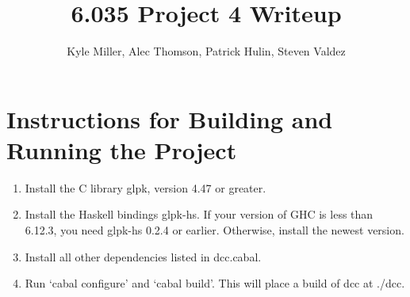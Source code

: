 \documentclass[11pt]{article}
\title{6.035 Project 4 Writeup}
\author{Kyle Miller, Alec Thomson, Patrick Hulin, Steven Valdez}
\begin{document}
\maketitle

\section {Instructions for Building and Running the Project}
\begin{enumerate}
\item Install the C library glpk, version 4.47 or greater.
\item Install the Haskell bindings glpk-hs. If your version of GHC is
less than 6.12.3, you need glpk-hs 0.2.4 or earlier.  Otherwise,
install the newest version.
\item Install all other dependencies listed in dcc.cabal.
\item Run `cabal configure' and `cabal build'. This will place a build
of dcc at ./dcc.
\end{enumerate}
\end{document}
